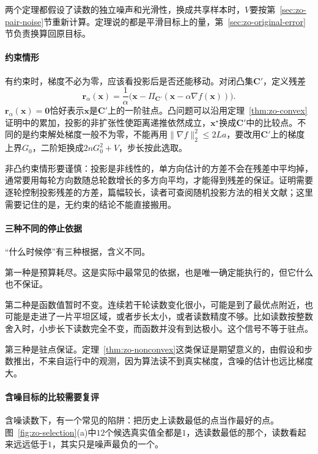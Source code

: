 两个定理都假设了读数的独立噪声和光滑性，换成共享样本时，$V$要按第~\ref{sec:zo-pair-noise}节重新计算。定理说的都是平滑目标上的量，第~\ref{sec:zo-original-error}节负责换算回原目标。

\paragraph{约束情形}
有约束时，梯度不必为零，应该看投影后是否还能移动。对闭凸集$\bm{C}'$，定义残差
\begin{equation}
 \bm{r}_\alpha(\bm{x})=\frac{1}{\alpha}\bigl(\bm{x}-\Pi_{\bm{C}'}(\bm{x}-\alpha\nabla f(\bm{x}))\bigr).
 \label{eq:zo-projected-residual}
\end{equation}
$\bm{r}_\alpha(\bm{x})=\bm{0}$恰好表示$\bm{x}$是$\bm{C}'$上的一阶驻点。凸问题可以沿用定理~\ref{thm:zo-convex}证明中的累加，投影的非扩张性使距离递推依然成立，$\bm{x}^\star$换成$\bm{C}'$中的比较点。不同的是约束解处梯度一般不为零，不能再用$\lVert\nabla f\rVert_2^2\leq2La$，要改用$\bm{C}'$上的梯度上界$G_0$，二阶矩换成$2nG_0^2+V$，步长按此选取。

非凸约束情形要谨慎：投影是非线性的，单方向估计的方差不会在残差中平均掉，通常要用每轮方向数随总轮数增长的多方向平均，才能得到残差的保证。证明需要逐轮控制投影残差的方差，篇幅较长，读者可查阅随机投影方法的相关文献；这里需要记住的是，无约束的结论不能直接搬用。

\paragraph{三种不同的停止依据}
“什么时候停”有三种根据，含义不同。

第一种是预算耗尽。这是实际中最常见的依据，也是唯一确定能执行的，但它什么也不保证。

第二种是函数值暂时不变。连续若干轮读数变化很小，可能是到了最优点附近，也可能是走进了一片平坦区域，或者步长太小，或者读数精度不够。比如读数按整数舍入时，小步长下读数完全不变，而函数并没有到达极小。这个信号不等于驻点。

第三种是驻点保证。定理~\ref{thm:zo-nonconvex}这类保证是期望意义的，由假设和步数推出，不来自运行中的观测，因为算法读不到真实梯度，含噪的估计也远比梯度大。

\paragraph{含噪目标的比较需要复评}
含噪读数下，有一个常见的陷阱：把历史上读数最低的点当作最好的点。图~\ref{fig:zo-selection}(a)中$12$个候选真实值全都是$1$，选读数最低的那个，读数看起来远远低于$1$，其实只是噪声最负的一个。

